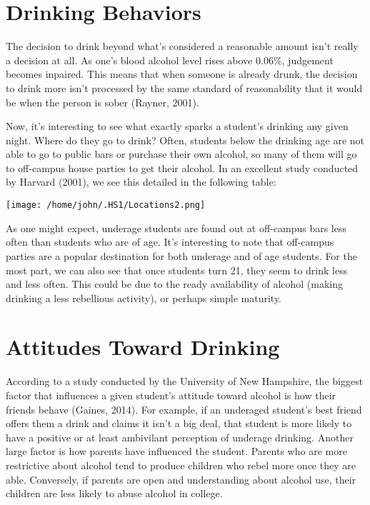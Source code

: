 \documentclass[12pt, man]{apa6}
\begin{document}
\section{Drinking Behaviors}
The decision to drink beyond what's considered a reasonable amount isn't really a decision at all. As one's blood alcohol level rises above 0.06\%, judgement becomes inpaired. This means that when someone is already drunk, the decision to drink more isn't processed by the same standard of reasonability that it would be when the person is sober (Rayner, 2001).

Now, it's interesting to see what exactly sparks a student's drinking any given night. Where do they go to drink? Often, students below the drinking age are not able to go to public bars or purchase their own alcohol, so many of them will go to off-campus house parties to get their alcohol. In an excellent study conducted by Harvard (2001), we see this detailed in the following table:\\
\vspace{5 mm}
\centerline{\texttt{[image: /home/john/.HS1/Locations2.png]}}

As one might expect, underage students are found out at off-campus bars less often than students who are of age. It's interesting to note that off-campus parties are a popular destination for both underage and of age students. For the most part, we can also see that once students turn 21, they seem to drink less and less often. This could be due to the ready availability of alcohol (making drinking a less rebellious activity), or perhaps simple maturity.

\section{Attitudes Toward Drinking}
According to a study conducted by the University of New Hampshire, the biggest factor that influences a given student's attitude toward alcohol is how their friends behave (Gaines, 2014). For example, if an underaged student's best friend offers them a drink and claims it isn't a big deal, that student is more likely to have a positive or at least ambivilant perception of underage drinking. Another large factor is how parents have influenced the student. Parents who are more restrictive about alcohol tend to produce children who rebel more once they are able. Conversely, if parents are open and understanding about alcohol use, their children are less likely to abuse alcohol in college.
\end{document}
